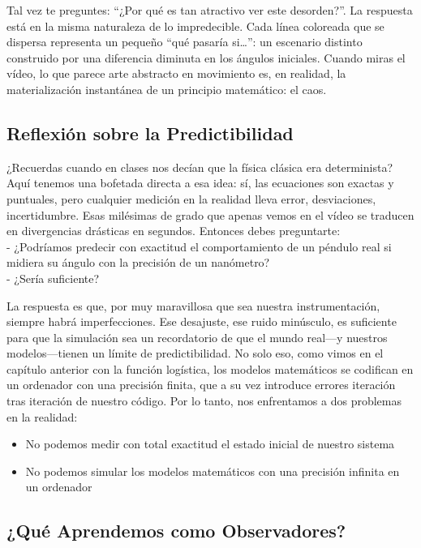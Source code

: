 \documentclass[
  10pt,
  a4paper,
  DIV=11,
  numbers=noendperiod,
  open=any]{scrreprt}
\providecommand{\tightlist}{%
  \setlength{\itemsep}{0pt}\setlength{\parskip}{0pt}}
\numberwithin{equation}{chapter}
\numberwithin{equation}{chapter}
\renewcommand{\[}{\begin{equation}}
\renewcommand{\]}{\end{equation}}
\begin{document}
Tal vez te preguntes: ``¿Por qué es tan atractivo ver este desorden?''.
La respuesta está en la misma naturaleza de lo impredecible. Cada línea
coloreada que se dispersa representa un pequeño ``qué pasaría
si\ldots{}'': un escenario distinto construido por una diferencia
diminuta en los ángulos iniciales. Cuando miras el vídeo, lo que parece
arte abstracto en movimiento es, en realidad, la materialización
instantánea de un principio matemático: el caos.

\subsection{Reflexión sobre la
Predictibilidad}\label{reflexiuxf3n-sobre-la-predictibilidad}

¿Recuerdas cuando en clases nos decían que la física clásica era
determinista? Aquí tenemos una bofetada directa a esa idea: sí, las
ecuaciones son exactas y puntuales, pero cualquier medición en la
realidad lleva error, desviaciones, incertidumbre. Esas milésimas de
grado que apenas vemos en el vídeo se traducen en divergencias drásticas
en segundos. Entonces debes preguntarte:\\
- ¿Podríamos predecir con exactitud el comportamiento de un péndulo real
si midiera su ángulo con la precisión de un nanómetro?\\
- ¿Sería suficiente?

La respuesta es que, por muy maravillosa que sea nuestra
instrumentación, siempre habrá imperfecciones. Ese desajuste, ese ruido
minúsculo, es suficiente para que la simulación sea un recordatorio de
que el mundo real---y nuestros modelos---tienen un límite de
predictibilidad. No solo eso, como vimos en el capítulo anterior con la
función logística, los modelos matemáticos se codifican en un ordenador
con una precisión finita, que a su vez introduce errores iteración tras
iteración de nuestro código. Por lo tanto, nos enfrentamos a dos
problemas en la realidad:

\begin{itemize}
\tightlist
\item
  No podemos medir con total exactitud el estado inicial de nuestro
  sistema
\item
  No podemos simular los modelos matemáticos con una precisión infinita
  en un ordenador
\end{itemize}

\subsection{¿Qué Aprendemos como
Observadores?}\label{quuxe9-aprendemos-como-observadores}
\end{document}
